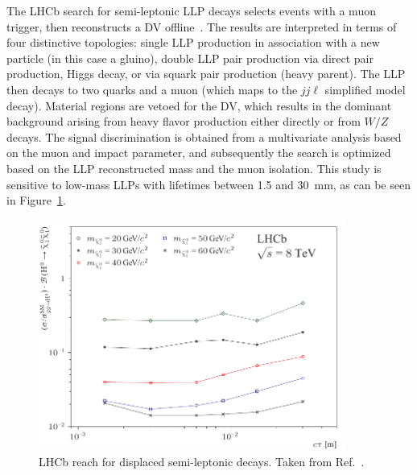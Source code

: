{The LHCb search for semi-leptonic LLP decays selects events with a muon trigger, then reconstructs a DV offline~\cite{Aaij:2016xmb}. The results are interpreted in terms of four distinctive topologies: single LLP production in association with a new particle (in this case a gluino), double LLP pair production via direct pair production, Higgs decay, or via squark pair production (heavy parent). The LLP then decays to two quarks and a muon (which maps to the $jj\ell$ simplified model decay). Material regions are vetoed for the DV, which results in the dominant background arising from heavy flavor production either directly or from $W/Z$ decays. The signal discrimination is obtained from a multivariate analysis based on the muon \pT and impact parameter, and subsequently the search is optimized based on the LLP reconstructed mass and the muon isolation. This study is sensitive to low-mass LLPs with lifetimes between 1.5 and 30~mm, as can be seen in Figure~\ref{fig:lhcbsemi-leptonic}.
%
\begin{figure}[htb]
\centering
\includegraphics[width=0.9\textwidth]{plots/PAPER-2016-047_sup1.pdf}
\caption{LHCb reach for displaced semi-leptonic decays. Taken from Ref.~\cite{Aaij:2016xmb}.}
\label{fig:lhcbsemi-leptonic}
\end{figure}

}
